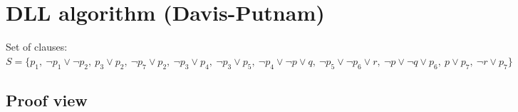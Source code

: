 \documentclass[a4paper,11pt]{article}
\begin{document}
\section*{DLL algorithm (Davis-Putnam)}

Set of clauses: $S = \{p_{1},\allowbreak\ \neg p_{1} \lor \neg p_{2},\allowbreak\ p_{3} \lor p_{2},\allowbreak\ \neg p_{7} \lor p_{2},\allowbreak\ \neg p_{3} \lor p_{4},\allowbreak\ \neg p_{3} \lor p_{5},\allowbreak\ \neg p_{4} \lor \neg p \lor q,\allowbreak\ \neg p_{5} \lor \neg p_{6} \lor r,\allowbreak\ \neg p \lor \neg q \lor p_{6},\allowbreak\ p \lor p_{7},\allowbreak\ \neg r \lor p_{7}\}$

\subsection*{Proof view}
\end{document}
